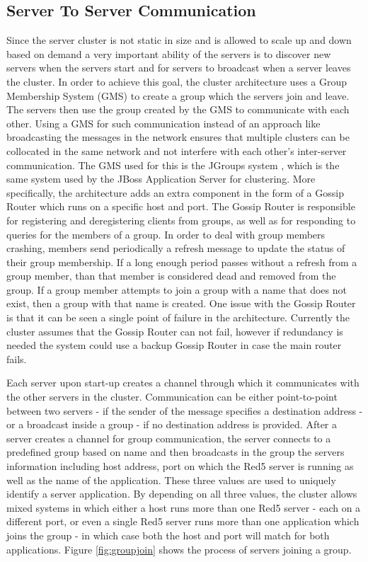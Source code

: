 \subsection{Server To Server Communication}

Since the server cluster is not static in size and is allowed to scale up and down based on demand a very important ability of the servers is to discover new servers when the servers start and for servers to broadcast when a server leaves the cluster. In order to achieve this goal, the cluster architecture uses a Group Membership System (GMS) to create a group which the servers join and leave. The servers then use the group created by the GMS to communicate with each other. Using a GMS for such communication instead of an approach like broadcasting the messages in the network ensures that multiple clusters can be collocated in the same network and not interfere with each other's inter-server communication. The GMS used for this is the JGroups system \cite{software:jgroups}, which is the same system used by the JBoss Application Server for clustering. More specifically, the architecture adds an extra component in the form of a Gossip Router which runs on a specific host and port. The Gossip Router is responsible for registering and deregistering clients from groups, as well as for responding to queries for the members of a group. In order to deal with group members crashing, members send periodically a refresh message to update the status of their group membership. If a long enough period passes without a refresh from a group member, than that member is considered dead and removed from the group. If a group member attempts to join a group with a name that does not exist, then a group with that name is created. One issue with the Gossip Router is that it can be seen a single point of failure in the architecture. Currently the cluster assumes that the Gossip Router can not fail, however if redundancy is needed the system could use a backup Gossip Router in case the main router fails.

Each server upon start-up creates a channel through which it communicates with the other servers in the cluster. Communication can be either point-to-point between two servers - if the sender of the message specifies a destination address - or a broadcast inside a group - if no destination address is provided. After a server creates a channel for group communication, the server connects to a predefined group based on name and then broadcasts in the group the servers information including host address, port on which the Red5 server is running as well as the name of the application. These three values are used to uniquely identify a server application. By depending on all three values, the cluster allows mixed systems in which either a host runs more than one Red5 server - each on a different port, or even a single Red5 server runs more than one application which joins the group - in which case both the host and port will match for both applications. Figure \ref{fig:groupjoin} shows the process of servers joining a group.

